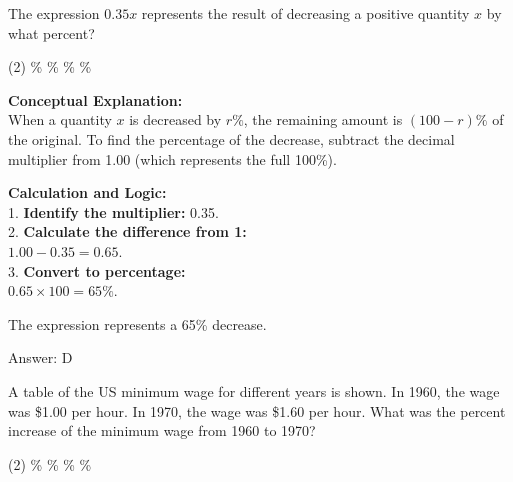 \documentclass[11pt,paper=a4,answers]{exam}
\begin{document}
\begin{questions}
\question
The expression $0.35x$ represents the result of decreasing a positive quantity $x$ by what percent?
\begin{tasks}(2)
    \%
    \%
    \%
    \%
\end{tasks}

\begin{solution}
\textbf{Conceptual Explanation:} \\
When a quantity $x$ is decreased by $r\%$, the remaining amount is $(100 - r)\%$ of the original. To find the percentage of the decrease, subtract the decimal multiplier from 1.00 (which represents the full 100\%).

\vspace{30pt}
\begin{center}
\end{center}
\vspace{30pt}

\textbf{Calculation and Logic:} \\
1. \textbf{Identify the multiplier:} 0.35. \\
2. \textbf{Calculate the difference from 1:} \\
   $1.00 - 0.35 = 0.65$. \\
3. \textbf{Convert to percentage:} \\
   $0.65 \times 100 = 65\%$.

\vspace{15pt}

The expression represents a 65\% decrease.

\vspace{30pt}

Answer: \colorbox{yellow!100}{D}
\end{solution}

\vspace{60pt}

\question
A table of the US minimum wage for different years is shown. In 1960, the wage was \$1.00 per hour. In 1970, the wage was \$1.60 per hour. What was the percent increase of the minimum wage from 1960 to 1970?
\begin{tasks}(2)
    \%
    \%
    \%
    \%
\end{tasks}


\end{questions}
\end{document}
